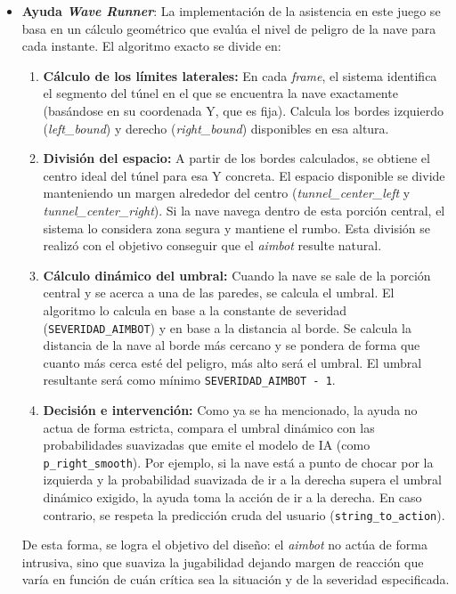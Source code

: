 \begin{itemize}
    \item \textbf{Ayuda \textit{Wave Runner}}: La implementación de la asistencia en este juego se basa en un cálculo geométrico que evalúa el nivel de peligro de la nave para cada instante. El algoritmo exacto se divide en:
    \begin{enumerate}
        \item \textbf{Cálculo de los límites laterales:} En cada \textit{frame}, el sistema identifica el segmento del túnel en el que se encuentra la nave exactamente (basándose en su coordenada Y, que es fija). Calcula los bordes izquierdo (\textit{left\_bound}) y derecho (\textit{right\_bound}) disponibles en esa altura.
        \item \textbf{División del espacio:} A partir de los bordes calculados, se obtiene el centro ideal del túnel para esa Y concreta. El espacio disponible se divide manteniendo un margen alrededor del centro (\textit{tunnel\_center\_left} y \textit{tunnel\_center\_right}). Si la nave navega dentro de esta porción central, el sistema lo considera zona segura y mantiene el rumbo. Esta división se realizó con el objetivo conseguir que el \textit{aimbot} resulte natural.
        \item \textbf{Cálculo dinámico del umbral:} Cuando la nave se sale de la porción central y se acerca a una de las paredes, se calcula el umbral. El algoritmo lo calcula en base a la constante de severidad (\texttt{SEVERIDAD\_AIMBOT}) y en base a la distancia al borde. Se calcula la distancia de la nave al borde más cercano y se pondera de forma que cuanto más cerca esté del peligro, más alto será el umbral. El umbral resultante será como mínimo \texttt{SEVERIDAD\_AIMBOT - 1}.
        \item \textbf{Decisión e intervención:} Como ya se ha mencionado, la ayuda no actua de forma estricta, compara el umbral dinámico con las probabilidades suavizadas que emite el modelo de IA (como \texttt{p\_right\_smooth}). Por ejemplo, si la nave está a punto de chocar por la izquierda y la probabilidad suavizada de ir a la derecha supera el umbral dinámico exigido, la ayuda toma la acción de ir a la derecha. En caso contrario, se respeta la predicción cruda del usuario (\texttt{string\_to\_action}).
    \end{enumerate}
    De esta forma, se logra el objetivo del diseño: el \textit{aimbot} no actúa de forma intrusiva, sino que suaviza la jugabilidad dejando margen de reacción que varía en función de cuán crítica sea la situación y de la severidad especificada.

\end{itemize}

